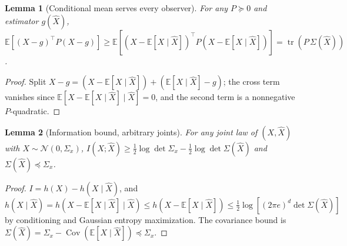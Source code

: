 \documentclass[11pt]{article}
\newtheorem{lemma}{Lemma}
\theoremstyle{definition}
\theoremstyle{remark}
\newcommand{\tr}{\operatorname{tr}}
\newcommand{\E}{\mathbb{E}}
\newcommand{\Cov}{\operatorname{Cov}}
\begin{document}
\begin{lemma}[Conditional mean serves every observer]\label{lem:cm}
For any $P\succeq0$ and estimator $g(\hat X)$, $\E[(X-g)^\top P(X-g)]\ge\E[(X-\E[X\mid
\hat X])^\top P(X-\E[X\mid\hat X])]=\tr(P\,\Sigma(\hat X))$.
\end{lemma}
\begin{proof}
Split $X-g=(X-\E[X\mid\hat X])+(\E[X\mid\hat X]-g)$; the cross term vanishes since
$\E[X-\E[X\mid\hat X]\mid\hat X]=0$, and the second term is a nonnegative $P$-quadratic.
\end{proof}

\begin{lemma}[Information bound, arbitrary joints]\label{lem:info}
For any joint law of $(X,\hat X)$ with $X\sim\mathcal N(0,\Sigma_x)$,
$I(X;\hat X)\ge\tfrac12\log\det\Sigma_x-\tfrac12\log\det\Sigma(\hat X)$ and
$\Sigma(\hat X)\preceq\Sigma_x$.
\end{lemma}
\begin{proof}
$I=h(X)-h(X\mid\hat X)$, and $h(X\mid\hat X)=h(X-\E[X\mid\hat X]\mid\hat X)\le h(X-\E[X
\mid\hat X])\le\tfrac12\log[(2\pi e)^d\det\Sigma(\hat X)]$ by conditioning and Gaussian
entropy maximization. The covariance bound is $\Sigma(\hat X)=\Sigma_x-\Cov(\E[X\mid
\hat X])\preceq\Sigma_x$.
\end{proof}
\end{document}
